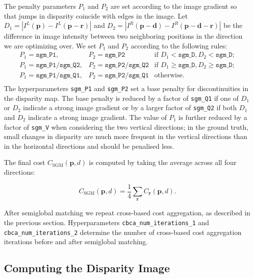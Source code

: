 \documentclass[twoside,11pt]{article}
\begin{document}
The penalty parameters $P_1$ and $P_2$ are set according to the image gradient
so that jumps in disparity coincide with edges in the image. Let $D_1 =
|I^L(\mathbf{p}) - I^L(\mathbf{p} - \mathbf{r})|$ and $D_2 = |I^R(\mathbf{p}-\mathbf{d})
- I^R(\mathbf{p}-\mathbf{d} - \mathbf{r})|$ be the difference in image intensity between
two neighboring positions in the direction we are optimizing over. We set
$P_1$ and $P_2$ according to the following rules:
%
\[ \begin{array}{lll} 
P_1 = \texttt{sgm\_P1}, &P_2 = \texttt{sgm\_P2} & 
\text{if $D_1 < \texttt{sgm\_D}, D_2 < \texttt{sgm\_D}$}; \\ 
P_1 = \texttt{sgm\_P1} / \texttt{sgm\_Q2}, &P_2 = \texttt{sgm\_P2} / \texttt{sgm\_Q2} & 
\text{if $D_1 \geq \texttt{sgm\_D}, D_2 \geq \texttt{sgm\_D}$}; \\ 
P_1 = \texttt{sgm\_P1} / \texttt{sgm\_Q1}, &P_2 = \texttt{sgm\_P2} / \texttt{sgm\_Q1} & 
\text{otherwise.} \\ 
\end{array} \]
%
The hyperparameters \texttt{sgm\_P1} and \texttt{sgm\_P2} set a base penalty
for discontinuities in the disparity map. The base penalty is reduced by a
factor of \texttt{sgm\_Q1} if one of $D_1$ or $D_2$ indicate a strong image
gradient or by a larger factor of \texttt{sgm\_Q2} if both $D_1$ and $D_2$
indicate a strong image gradient. The value of $P_1$ is further reduced by a
factor of \texttt{sgm\_V} when considering the two vertical directions; in the
ground truth, small changes in disparity are much more frequent in the vertical
directions than in the horizontal directions and should be penalised less. 

The final cost $C_\text{SGM}(\mathbf{p}, d)$ is computed by taking the
average across all four directions:

\begin{equation*} 
C_\text{SGM}(\mathbf{p}, d) = \frac{1}{4} \sum_{\mathbf{r}}
C_{\mathbf{r}}(\mathbf{p}, d). 
\end{equation*}

After semiglobal matching we repeat cross-based cost aggregation, as described
in the previous section. Hyperparameters \texttt{cbca\_num\_iterations\_1}
and \texttt{cbca\_num\_iterations\_2} determine the number of cross-based
cost aggregation iterations before and after semiglobal matching.


\subsection{Computing the Disparity Image}
\end{document}
